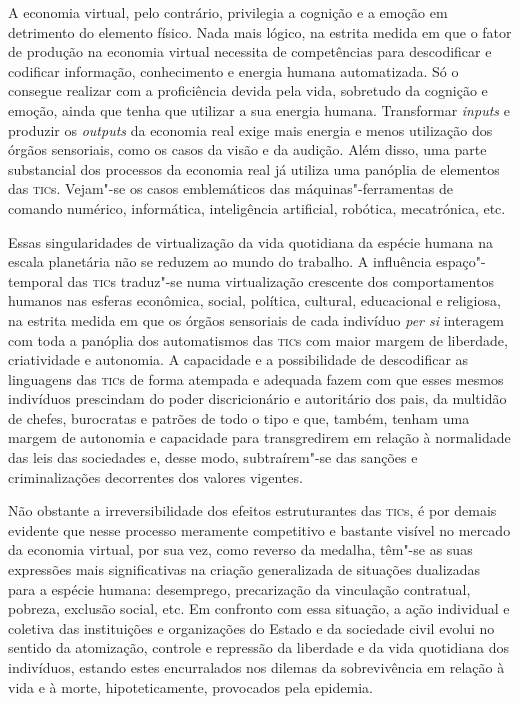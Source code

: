 A economia virtual, pelo contrário, privilegia a cognição e a emoção em
detrimento do elemento físico. Nada mais lógico, na estrita medida em
que o fator de produção na economia virtual necessita de competências
para descodificar e codificar informação, conhecimento e energia humana
automatizada. Só o consegue realizar com a proficiência devida pela
vida, sobretudo da cognição e emoção, ainda que tenha que utilizar a sua
energia humana. Transformar \emph{inputs} e produzir os \emph{outputs}
da economia real exige mais energia e menos utilização dos órgãos
sensoriais, como os casos da visão e da audição. Além disso, uma parte
substancial dos processos da economia real já utiliza uma panóplia de
elementos das \textsc{tic}s. Vejam"-se os casos emblemáticos das
máquinas"-ferramentas de comando numérico, informática, inteligência
artificial, robótica, mecatrónica, etc.

Essas singularidades de virtualização da vida quotidiana da espécie
humana na escala planetária não se reduzem ao mundo do trabalho. A
influência espaço"-temporal das \textsc{tic}s traduz"-se numa virtualização
crescente dos comportamentos humanos nas esferas econômica, social,
política, cultural, educacional e religiosa, na estrita medida em que os
órgãos sensoriais de cada indivíduo \emph{per si} interagem com toda a
panóplia dos automatismos das \textsc{tic}s com maior margem de liberdade,
criatividade e autonomia. A capacidade e a possibilidade de descodificar
as linguagens das \textsc{tic}s de forma atempada e adequada fazem com que esses
mesmos indivíduos prescindam do poder discricionário e autoritário dos
pais, da multidão de chefes, burocratas e patrões de todo o tipo e que,
também, tenham uma margem de autonomia e capacidade para transgredirem
em relação à normalidade das leis das sociedades e, desse modo,
subtraírem"-se das sanções e criminalizações decorrentes dos valores
vigentes.

Não obstante a irreversibilidade dos efeitos estruturantes das \textsc{tic}s, é
por demais evidente que nesse processo meramente competitivo e bastante
visível no mercado da economia virtual, por sua vez, como reverso da
medalha, têm"-se as suas expressões mais significativas na criação
generalizada de situações dualizadas para a espécie humana: desemprego,
precarização da vinculação contratual, pobreza, exclusão social, etc. Em
confronto com essa situação, a ação individual e coletiva das
instituições e organizações do Estado e da sociedade civil evolui no
sentido da atomização, controle e repressão da liberdade e da vida
quotidiana dos indivíduos, estando estes encurralados nos dilemas da
sobrevivência em relação à vida e à morte, hipoteticamente, provocados
pela epidemia.

